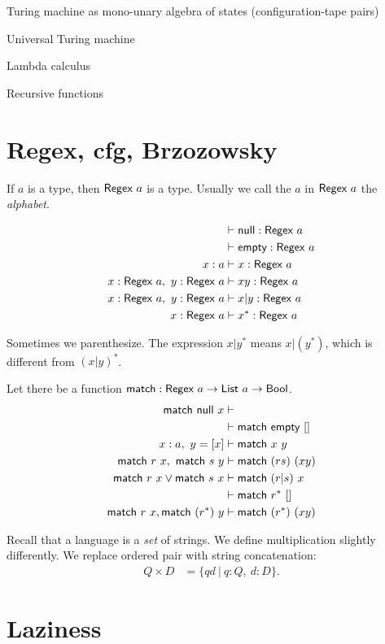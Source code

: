 Turing machine as mono-unary algebra of states (configuration-tape pairs)

Universal Turing machine

Lambda calculus

Recursive functions

\section{Regex, cfg, Brzozowsky}

If \(a\) is a type, then \(\textsf{Regex}~a\) is a type.
Usually we call the \(a\) in \(\textsf{Regex}~a\) the \emph{alphabet}.

\begin{align}
    &\vdash \textsf{null} : \textsf{Regex}~a
    \\
    &\vdash \textsf{empty} : \textsf{Regex}~a
    \\
    x : a &\vdash x : \textsf{Regex}~a
    \\
    x : \textsf{Regex}~a, ~ y : \textsf{Regex}~a &\vdash xy : \textsf{Regex}~a
    \\
    x : \textsf{Regex}~a, ~ y : \textsf{Regex}~a &\vdash x|y : \textsf{Regex}~a
    \\
    x : \textsf{Regex}~a &\vdash x^* : \textsf{Regex}~a
\end{align}

Sometimes we parenthesize. The expression \(x|y^*\) means \(x|(y^*)\),
which is different from \((x|y)^*\).

Let there be a function \(\textsf{match} : \textsf{Regex}~a \to \textsf{List}~a \to \textsf{Bool}\).
\begin{align}
    \textsf{match}~\textsf{null}~x &\vdash
    \\
    &\vdash \textsf{match}~\textsf{empty}~[]
    \\
    x : a, ~ y = [x] &\vdash \textsf{match}~x~y
    \\
    \textsf{match}~r~x, ~ \textsf{match}~s~y &\vdash \textsf{match}~(rs)~(xy)
    \\
    \textsf{match}~r~x \vee \textsf{match}~s~x &\vdash \textsf{match}~(r|s)~x
    \\
    &\vdash \textsf{match}~r^*~[]
    \\
    \textsf{match}~r~x, \textsf{match}~(r^*)~y &\vdash \textsf{match}~(r^*)~(xy)
\end{align}

Recall that a language is a \emph{set} of strings.
We define multiplication slightly differently.
We replace ordered pair with string concatenation:
\begin{align}
    Q \times D &= \{ qd ~|~ q : Q, ~ d : D \}.
\end{align}

\section{Laziness}


